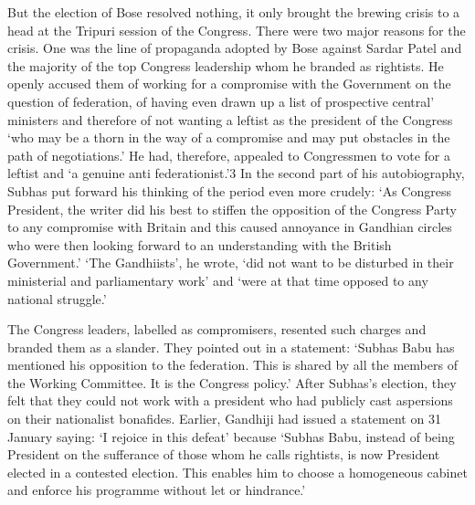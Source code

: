 But the election of Bose resolved nothing, it only brought the brewing crisis to a head at the Tripuri session of the Congress. There were two major reasons for the crisis. One was the line of propaganda adopted by Bose against Sardar Patel and the majority of the top Congress leadership whom he branded as rightists. He openly accused them of working for a compromise with the Government on the question of federation, of having even drawn up a list of prospective central’ ministers and therefore of not wanting a leftist as the president of the Congress ‘who may be a thorn in the way of a compromise and may put obstacles in the path of negotiations.’ He had, therefore, appealed to Congressmen to vote for a leftist and ‘a genuine anti­ federationist.’3 In the second part of his autobiography, Subhas put forward his thinking of the period even more crudely: ‘As Congress President, the writer did his best to stiffen the opposition of the Congress Party to any compromise with Britain and this caused annoyance in Gandhian circles who were then looking forward to an understanding with the British Government.’ ‘The Gandhiists’, he wrote, ‘did not want to be disturbed in their ministerial and parliamentary work’ and ‘were at that time opposed to any national struggle.’ 

The Congress leaders, labelled as compromisers, resented such charges and branded them as a slander. They pointed out in a statement: ‘Subhas Babu has mentioned his opposition to the federation. This is shared by all the members of the Working Committee. It is the Congress policy.’ After Subhas’s election, they felt that they could not work with a president who had publicly cast aspersions on their nationalist bonafides. Earlier, Gandhiji had issued a statement on 31 January saying: ‘I rejoice in this defeat’ because ‘Subhas Babu, instead of being President on the sufferance of those whom he calls rightists, is now President elected in a contested election. This enables him to choose a homogeneous cabinet and enforce his programme without let or hindrance.’ 

